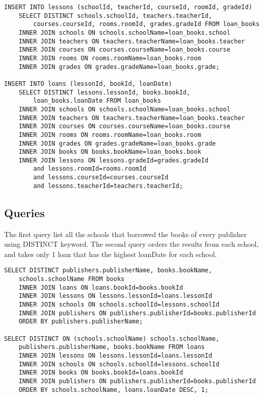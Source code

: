 \documentclass[11pt]{article}
\begin{document}
\begin{verbatim}
INSERT INTO lessons (schoolId, teacherId, courseId, roomId, gradeId)
    SELECT DISTINCT schools.schoolId, teachers.teacherId,
        courses.courseId, rooms.roomId, grades.gradeId FROM loan_books
    INNER JOIN schools ON schools.schoolName=loan_books.school
    INNER JOIN teachers ON teachers.teacherName=loan_books.teacher
    INNER JOIN courses ON courses.courseName=loan_books.course
    INNER JOIN rooms ON rooms.roomName=loan_books.room
    INNER JOIN grades ON grades.gradeName=loan_books.grade;

INSERT INTO loans (lessonId, bookId, loanDate)
    SELECT DISTINCT lessons.lessonId, books.bookId,
        loan_books.loanDate FROM loan_books
    INNER JOIN schools ON schools.schoolName=loan_books.school
    INNER JOIN teachers ON teachers.teacherName=loan_books.teacher
    INNER JOIN courses ON courses.courseName=loan_books.course
    INNER JOIN rooms ON rooms.roomName=loan_books.room
    INNER JOIN grades ON grades.gradeName=loan_books.grade
    INNER JOIN books ON books.bookName=loan_books.book
    INNER JOIN lessons ON lessons.gradeId=grades.gradeId
        and lessons.roomId=rooms.roomId
        and lessons.courseId=courses.courseId
        and lessons.teacherId=teachers.teacherId;
\end{verbatim}
\subsection{Queries}
\label{sec:org917674e}
The first query list all the schools that borrowed the books of every publisher using DISTINCT keyword.
The second query orders the results from each school, and takes only 1 loan that has the highest loanDate for each school.
\begin{verbatim}
SELECT DISTINCT publishers.publisherName, books.bookName,
    schools.schoolName FROM books
    INNER JOIN loans ON loans.bookId=books.bookId
    INNER JOIN lessons ON lessons.lessonId=loans.lessonId
    INNER JOIN schools ON schools.schoolId=lessons.schoolId
    INNER JOIN publishers ON publishers.publisherId=books.publisherId
    ORDER BY publishers.publisherName;

SELECT DISTINCT ON (schools.schoolName) schools.schoolName,
    publishers.publisherName, books.bookName FROM loans
    INNER JOIN lessons ON lessons.lessonId=loans.lessonId
    INNER JOIN schools ON schools.schoolId=lessons.schoolId
    INNER JOIN books ON books.bookId=loans.bookId
    INNER JOIN publishers ON publishers.publisherId=books.publisherId
    ORDER BY schools.schoolName, loans.loanDate DESC, 1;
\end{verbatim}
\end{document}
